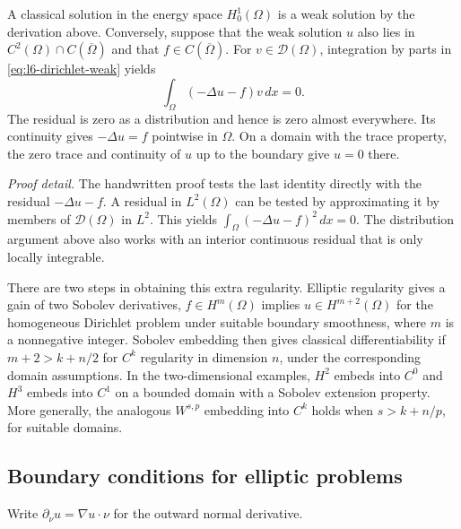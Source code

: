\documentclass[11pt,a4paper]{article}
\begin{document}
A classical solution in the energy space \(H_0^1(\Omega)\) is a
weak solution by the derivation above. Conversely, suppose that
the weak solution \(u\) also lies in
\(C^2(\Omega)\cap C(\overline\Omega)\) and that
\(f\in C(\overline\Omega)\). For \(v\in\mathcal D(\Omega)\),
integration by parts in \eqref{eq:l6-dirichlet-weak} yields
\[
  \int_\Omega(-\Delta u-f)v\,dx=0 .
\]
The residual is zero as a distribution and hence is zero almost
everywhere. Its continuity gives \(-\Delta u=f\) pointwise in
\(\Omega\). On a domain with the trace property, the zero trace
and continuity of \(u\) up to the boundary give \(u=0\) there.

\smallskip
\noindent\emph{Proof detail.}
The handwritten proof tests the last identity directly with the
residual \(-\Delta u-f\). A residual in \(L^2(\Omega)\) can be
tested by approximating it by members of \(\mathcal D(\Omega)\)
in \(L^2\). This yields \(\int_\Omega(-\Delta u-f)^2\,dx=0\).
The distribution argument above also works with an interior
continuous residual that is only locally integrable.

There are two steps in obtaining this extra regularity.
Elliptic regularity gives a gain of two Sobolev derivatives,
\(f\in H^m(\Omega)\) implies \(u\in H^{m+2}(\Omega)\) for the
homogeneous Dirichlet problem under suitable boundary smoothness,
where \(m\) is a nonnegative integer.
Sobolev embedding then gives classical differentiability if
\(m+2>k+n/2\) for \(C^k\) regularity in dimension \(n\), under
the corresponding domain assumptions. In the two-dimensional
examples, \(H^2\) embeds into \(C^0\) and \(H^3\) embeds into
\(C^1\) on a bounded domain with a Sobolev extension property.
More generally, the analogous \(W^{s,p}\) embedding into \(C^k\)
holds when \(s>k+n/p\), for suitable domains.

\subsection{Boundary conditions for elliptic problems}

Write \(\partial_\nu u=\nabla u\cdot\nu\) for the outward
normal derivative.
\end{document}
